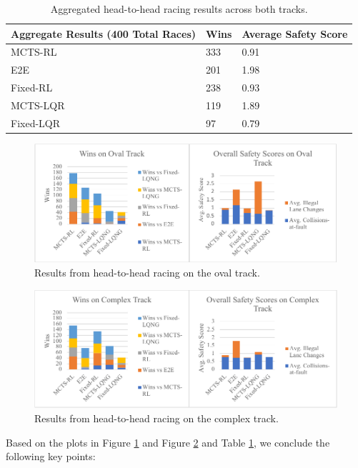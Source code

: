 \begin{table}
    \centering
    \begin{tabular}{|p{4cm}|l|l|}
    \hline
        \textbf{Aggregate Results (400 Total Races)} & \textbf{Wins} & \textbf{Average Safety Score} \\ \hline
        MCTS-RL & 333 & 0.91 \\ \hline
        E2E & 201 & 1.98 \\ \hline
        Fixed-RL & 238 & 0.93  \\ \hline
        MCTS-LQR & 119 & 1.89 \\ \hline
        Fixed-LQR & 97 & 0.79 \\ \hline
    \end{tabular}
    \caption[Aggregated head-to-head racing results.]{Aggregated head-to-head racing results across both tracks.}
    \label{tab:aggr_results}
\end{table}

\begin{figure}
  \centering
  \includegraphics[width=\textwidth]{Figures/HeadOvalResults.pdf}
  \caption{Results from head-to-head racing on the oval track.}
  \label{fig:results_oval}
\end{figure}

\begin{figure}
\centering
  \includegraphics[width=\textwidth]{Figures/HeadComplexResults.pdf}
  \caption{Results from head-to-head racing on the complex track.}
  \label{fig:results_complex}
\end{figure}
\FloatBarrier
Based on the plots in Figure \ref{fig:results_oval} and Figure \ref{fig:results_complex} and Table \ref{tab:aggr_results}, we conclude the following key points:

